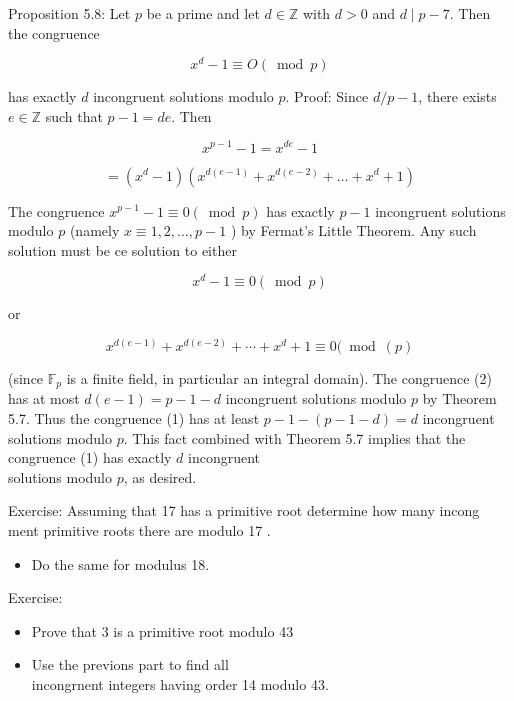\documentclass[10pt]{article}
\begin{document}
Proposition 5.8: Let $p$ be a prime and let $d \in \mathbb{Z}$ with $d>0$ and $d \mid p-7$. Then the congruence

$$
x^{d}-1 \equiv O(\bmod p)
$$

has exactly $d$ incongruent solutions modulo $p$. Proof: Since $d / p-1$, there exists $e \in \mathbb{Z}$ such that $p-1=d e$. Then

$$
x^{p-1}-1=x^{d e}-1
$$

$$
=\left(x^{d}-1\right)\left(x^{d(e-1)}+x^{d(e-2)}+\ldots+x^{d}+1\right)
$$

The congruence $x^{p-1}-1 \equiv 0(\bmod p)$ has exactly $p-1$ incongruent solutions modulo $p$ (namely $x \equiv 1,2, \ldots, p-1$ ) by Fermat's Little Theorem. Any such solution must be ce solution to either


\begin{equation*}
x^{d}-1 \equiv 0(\bmod p) \tag{1}
\end{equation*}


or


\begin{equation*}
x^{d(e-1)}+x^{d(e-2)}+\cdots+x^{d}+1 \equiv 0(\bmod (p) \tag{2}
\end{equation*}


(since $\mathbb{F}_{p}$ is a finite field, in particular an integral domain). The congruence (2) has at most $d(e-1)=p-1-d$ incongruent solutions modulo $p$ by Theorem 5.7. Thus the congruence (1) has at least $p-1-(p-1-d)=d$ incongruent solutions modulo $p$. This fact combined with Theorem 5.7 implies that the congruence (1) has exactly $d$ incongruent\\
solutions modulo $p$, as desired.

Exercise: Assuming that 17 has a primitive root determine how many incong ment primitive roots there are modulo 17 .

\begin{itemize}
  \item Do the same for modulus 18.
\end{itemize}

Exercise:

\begin{itemize}
  \item Prove that 3 is a primitive root modulo 43
  \item Use the previons part to find all\\
incongrnent integers having order 14 modulo 43.
\end{itemize}
\end{document}
